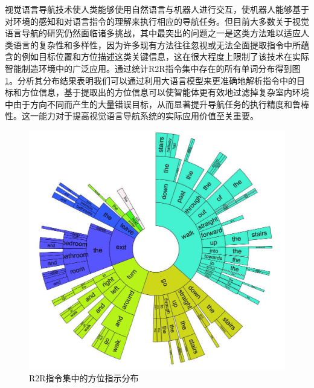 视觉语言导航技术使人类能够使用自然语言与机器人进行交互，使机器人能够基于对环境的感知和对语言指令的理解来执行相应的导航任务。但目前大多数关于视觉语言导航的研究仍然面临诸多挑战，其中最突出的问题之一是这类方法难以适应人类语言的复杂性和多样性，因为许多现有方法往往忽视或无法全面提取指令中所蕴含的例如目标位置和方位描述这类关键信息，这在很大程度上限制了该技术在实际智能制造环境中的广泛应用。通过统计R2R指令集中存在的所有单词分布得到图\ref{instruction_words}。分析其分布结果表明我们可以通过利用大语言模型来更准确地解析指令中的目标和方位信息，基于提取出的方位信息可以使智能体更有效地过滤掉复杂室内环境中由于方向不同而产生的大量错误目标，从而显著提升导航任务的执行精度和鲁棒性。这一能力对于提高视觉语言导航系统的实际应用价值至关重要。
\begin{figure}[htbp]
    \centering
    \includegraphics[scale=0.55]{Fig/instruction_words.png}
    \caption{\label{instruction_words}R2R指令集中的方位指示分布}
\end{figure}

